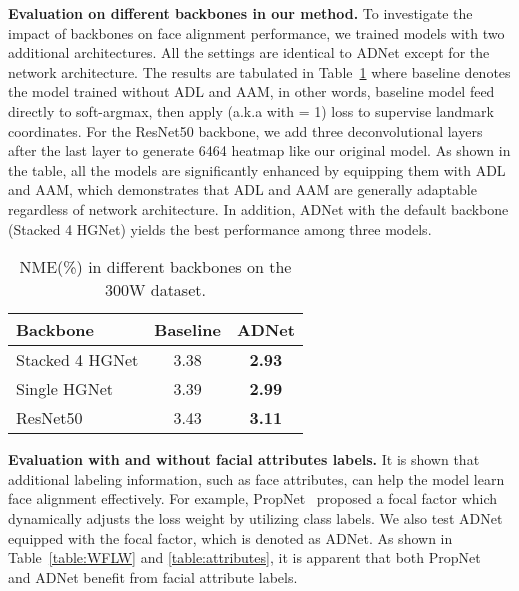 \documentclass[10pt,twocolumn,letterpaper]{article}
\begin{document}
\vspace{5pt}
\noindent\textbf{Evaluation on different backbones in our method.}
To investigate the impact of backbones on face alignment performance, we trained models with two additional architectures.
All the settings are identical to ADNet except for the network architecture.
The results are tabulated in Table~\ref{table:backbones} where baseline denotes the model trained without ADL and AAM, in other words, baseline model feed  directly to soft-argmax, then apply  (a.k.a  with  = 1) loss to supervise landmark coordinates. 
For the ResNet50 backbone, we add three deconvolutional layers after the last layer to generate 6464 heatmap like our original model.
As shown in the table, all the models are significantly enhanced by equipping them with ADL and AAM, which demonstrates that ADL and AAM are generally adaptable regardless of network architecture.
In addition, ADNet with the default backbone (Stacked 4 HGNet) yields the best performance among three models.

\begin{table}[ht]
\begin{center}
\begin{tabular}{|l|c|c|}
\hline
Backbone & Baseline & ADNet \\
\hline
Stacked 4 HGNet \cite{newell2016stacked} & 3.38 & \textbf{2.93} \\
\hline
Single HGNet \cite{newell2016stacked} & 3.39 & \textbf{2.99} \\
\hline
ResNet50 \cite{he2016deep} & 3.43 & \textbf{3.11} \\
\hline
\end{tabular}
\end{center}
\caption{NME(\%) in different backbones on the 300W dataset.}
\label{table:backbones}
\end{table}


\noindent\textbf{Evaluation with and without facial attributes labels.}
It is shown that additional labeling information, such as face attributes, can help the model learn face alignment effectively. 
For example, PropNet~\cite{huang2020propagationnet} proposed a focal factor which dynamically adjusts the loss weight by utilizing class labels. 
We also test ADNet equipped with the focal factor, which is denoted as ADNet.
As shown in Table~\ref{table:WFLW} and \ref{table:attributes}, it is apparent that both PropNet~\cite{huang2020propagationnet} and ADNet benefit from facial attribute labels.
\end{document}
